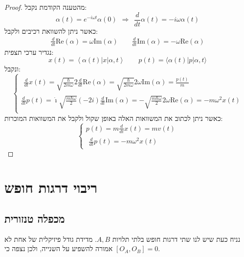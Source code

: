 \documentclass{tstextbook}
\begin{document}
\begin{proof}
מהטענה הקודמת נקבל:
$$\alpha(t)=e^{-i\omega t}\alpha(0)\ \ \Rightarrow\ \ \frac{d}{d t}\alpha(t)=-i\omega\alpha(t)$$
כאשר ניתן להשוואת רכיבים ולקבל:
$$\begin{array}{l}{{\frac{d}{d t}\mathrm{Re}\left( \alpha \right)=\omega\mathrm{Im}\left( \alpha \right)}}\qquad  {{\frac{d}{d t}\mathrm{Im}\left( \alpha \right)=-\omega \mathrm{Re}\left( \alpha \right)}}\end{array}$$
נגדיר ערכי תצפית:
$$x(t)=\left\langle \alpha(t)|x|\alpha,t \right\rangle \qquad p(t)=\langle\alpha(t)|p|\alpha,t\rangle$$
ונקבל:
$$\begin{cases}{\begin{array}{l}{{\frac{d}{d t}}x(t)={\sqrt{{\frac{\hbar}{2m\omega}}}}2{\frac{d}{d t}}\mathrm{Re}\left( \alpha \right)={\sqrt{\frac{\hbar}{2m\omega}}}2\omega \mathrm{Im}\left( \alpha \right)={\frac{p(t)}{m}}}\end{array}} \\\textstyle{\frac{d}{d t}}p(t)={\dot{\imath}}{\sqrt{\frac{m\hbar\omega}{2}}}(-2i){\frac{d}{d t}}\mathrm{Im}\left( \alpha \right)=-{\sqrt{\frac{m\hbar\omega}{2}}}2\omega \mathrm{Re}\left( \alpha \right)=-m\omega^{2}x(t) \\
\end{cases}$$
כאשר ניתן לכתוב את המשוואות האלה באופן שקול ולקבל את המשוואות המוכרות:
$$\begin{cases}p(t)=m{\frac{d}{d t}}x(t)=m v(t) \\{\begin{array}{l}{{\frac{d}{d t}}p(t)=-m\omega^{2}x(t)}\end{array}}
\end{cases}$$

\end{proof}
\section{ריבוי דרגות חופש}

\subsection{מכפלה טנזורית}

נניח כעת שיש לנו שתי דרגות חופש בלתי תלויות \(A,B\). מדידת גודל פיזיקלית של אחת לא אמורה להשפיע על השנייה, ולכן נצפה כי \([O_{A},O_{B}]=0\).
\end{document}
